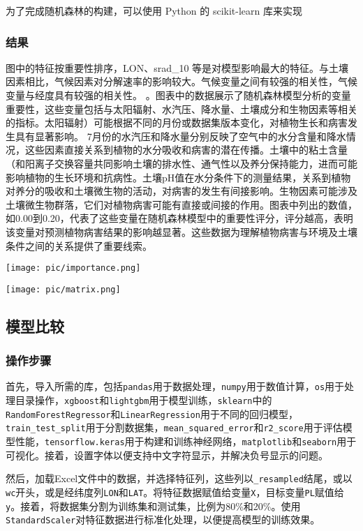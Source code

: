 \documentclass{article}
\begin{document}
		为了完成随机森林的构建，可以使用 Python 的 scikit-learn 库来实现
	\subsubsection{结果}
	
	图中的特征按重要性排序，LON、srad\_10 等是对模型影响最大的特征。与土壤因素相比，气候因素对分解速率的影响较大。气候变量之间有较强的相关性，气候变量与经度具有较强的相关性。
	。图表中的数据展示了随机森林模型分析的变量重要性，这些变量包括与太阳辐射、水汽压、降水量、土壤成分和生物因素等相关的指标。太阳辐射）可能根据不同的月份或数据集版本变化，对植物生长和病害发生具有显著影响。
	7月份的水汽压和降水量分别反映了空气中的水分含量和降水情况，这些因素直接关系到植物的水分吸收和病害的潜在传播。土壤中的粘土含量（和阳离子交换容量共同影响土壤的排水性、通气性以及养分保持能力，进而可能影响植物的生长环境和抗病性。土壤pH值在水分条件下的测量结果，关系到植物对养分的吸收和土壤微生物的活动，对病害的发生有间接影响。生物因素可能涉及土壤微生物群落，它们对植物病害可能有直接或间接的作用。图表中列出的数值，如0.00到0.20，代表了这些变量在随机森林模型中的重要性评分，评分越高，表明该变量对预测植物病害结果的影响越显著。这些数据为理解植物病害与环境及土壤条件之间的关系提供了重要线索。
	
	\par
\texttt{[image: pic/importance.png]} %
\par
\texttt{[image: pic/matrix.png]} %

	\subsection{模型比较}

\subsubsection{操作步骤}
首先，导入所需的库，包括\texttt{pandas}用于数据处理，\texttt{numpy}用于数值计算，\texttt{os}用于处理目录操作，\texttt{xgboost}和\texttt{lightgbm}用于模型训练，\texttt{sklearn}中的\texttt{RandomForestRegressor}和\texttt{LinearRegression}用于不同的回归模型，\texttt{train\_test\_split}用于分割数据集，\texttt{mean\_squared\_error}和\texttt{r2\_score}用于评估模型性能，\texttt{tensorflow.keras}用于构建和训练神经网络，\texttt{matplotlib}和\texttt{seaborn}用于可视化。接着，设置字体以便支持中文字符显示，并解决负号显示的问题。

然后，加载Excel文件中的数据，并选择特征列，这些列以\texttt{\_resampled}结尾，或以\texttt{wc}开头，或是经纬度列\texttt{LON}和\texttt{LAT}。将特征数据赋值给变量\texttt{X}，目标变量\texttt{PL}赋值给\texttt{y}。接着，将数据集分割为训练集和测试集，比例为80\%和20\%。使用\texttt{StandardScaler}对特征数据进行标准化处理，以便提高模型的训练效果。
\end{document}
